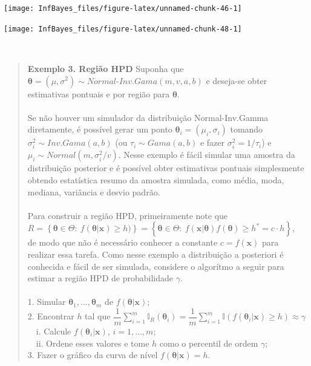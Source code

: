 \documentclass[
]{book}
\begin{document}
\begin{center}\texttt{[image: InfBayes\_files/figure-latex/unnamed-chunk-46-1]} \end{center}

\begin{center}\texttt{[image: InfBayes\_files/figure-latex/unnamed-chunk-48-1]} \end{center}

\(~\)

\begin{quote}
\textbf{Exemplo 3. Região HPD} Suponha que \(\boldsymbol \theta=(\mu,\sigma^2) \sim \textit{Normal-Inv.Gama}(m,v,a,b)\) e deseja-se obter estimativas pontuais e por região para \(\boldsymbol \theta\).\\
\(~\)\\
Se não houver um simulador da distribuição Normal-Inv.Gamma diretamente, é possível gerar um ponto \(\boldsymbol \theta_i=(\mu_i,\sigma_i)\) tomando \({\sigma}_i^2 \sim \textit{Inv.Gama}(a,b)\) (ou \(\tau_i \sim \textit{Gama}(a,b)\) e fazer \({\sigma}_i^2=1/\tau_i\)) e \(\mu_i \sim \textit{Normal}(m,{\sigma}_i^2/v)\). Nesse exemplo é fácil simular uma amostra da distribuição posterior e é possível obter estimativas pontuais simplesmente obtendo estatística resumo da amostra simulada, como média, moda, mediana, variância e desvio padrão.\\
\(~\)\\
Para construir a região HPD, primeiramente note que\\
\(R=\left\{\boldsymbol{\theta}\in\Theta :~f(\boldsymbol{\theta} | \boldsymbol{x})\geq h)\right\}=\left\{\boldsymbol{\theta}\in\Theta:~f(\boldsymbol x|\boldsymbol{\theta})f(\boldsymbol{\theta})\geq h^*=c\cdot h\right\}\),\\
de modo que não é necessário conhecer a constante \(c=f(\boldsymbol{x})\) para realizar essa tarefa. Como nesse exemplo a distribuição a posteriori é conhecida e fácil de ser simulada, considere o algorítmo a seguir para estimar a região HPD de probabilidade \(\gamma\).\\
\(~\)\\
1. Simular \(\boldsymbol{\theta}_1,...,\boldsymbol{\theta}_m\) de \(f(\boldsymbol{\theta}|\boldsymbol{x})\);\\
2. Encontrar \(h\) tal que \(\displaystyle \dfrac{1}{m}\sum_{i=1}^m\mathbb{I}_{R}(\boldsymbol{\theta}_i)=\dfrac{1}{m}\sum_{i=1}^m\mathbb{I}(f(\boldsymbol{\theta}_i|\boldsymbol{x})\geq h)\approx \gamma\)\\
\(~~~\) i. Calcule \(f(\boldsymbol{\theta}_i|\boldsymbol{x})\), \(i=1,\ldots,m\);\\
\(~~~\) ii. Ordene esses valores e tome \(h\) como o percentil de ordem \(\gamma\);\\
3. Fazer o gráfico da curva de nível \(f(\boldsymbol{\theta}|\boldsymbol{x})=h\).
\end{quote}
\end{document}
